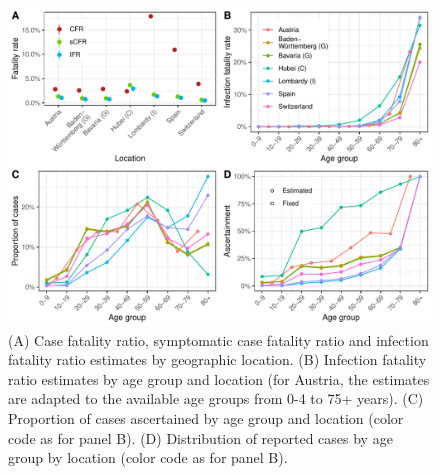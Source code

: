 \documentclass{article}
\begin{document}
\begin{figure}[h]
	\centering
	\includegraphics[width=\linewidth]{../format_output/figures_v3/fig4.pdf}
	\caption{(A) Case fatality ratio, symptomatic case fatality ratio and infection fatality ratio estimates by geographic location. (B) Infection fatality ratio estimates by age group and location (for Austria, the estimates are adapted to the available age groups from 0-4 to 75+ years). (C) Proportion of cases ascertained by age group and location (color code as for panel B). (D) Distribution of reported cases by age group by location (color code as for panel B).}
	\label{fig:country}
\end{figure}
\end{document}
